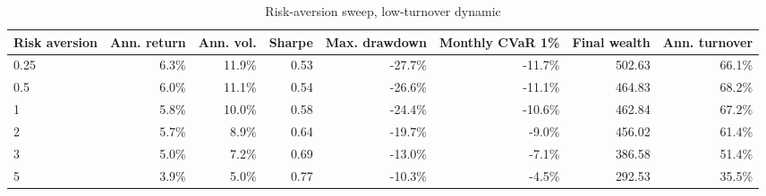 ﻿\begin{table}[!htbp]
\centering
\caption{Risk-aversion sweep, low-turnover dynamic}
\label{tab:allocation-risk-aversion-low-turnover}
\small
\setlength{\tabcolsep}{5pt}
\renewcommand{\arraystretch}{1.12}
\begin{adjustbox}{center,max width=\linewidth}
\begin{tabular}{lrrrrrrr}
\toprule
Risk aversion & Ann. return & Ann. vol. & Sharpe & Max. drawdown & Monthly CVaR 1\% & Final wealth & Ann. turnover \\
\midrule
0.25 & 6.3\% & 11.9\% & 0.53 & -27.7\% & -11.7\% & 502.63 & 66.1\% \\
0.5 & 6.0\% & 11.1\% & 0.54 & -26.6\% & -11.1\% & 464.83 & 68.2\% \\
1 & 5.8\% & 10.0\% & 0.58 & -24.4\% & -10.6\% & 462.84 & 67.2\% \\
2 & 5.7\% & 8.9\% & 0.64 & -19.7\% & -9.0\% & 456.02 & 61.4\% \\
3 & 5.0\% & 7.2\% & 0.69 & -13.0\% & -7.1\% & 386.58 & 51.4\% \\
5 & 3.9\% & 5.0\% & 0.77 & -10.3\% & -4.5\% & 292.53 & 35.5\% \\
\bottomrule
\end{tabular}
\end{adjustbox}
\end{table}
